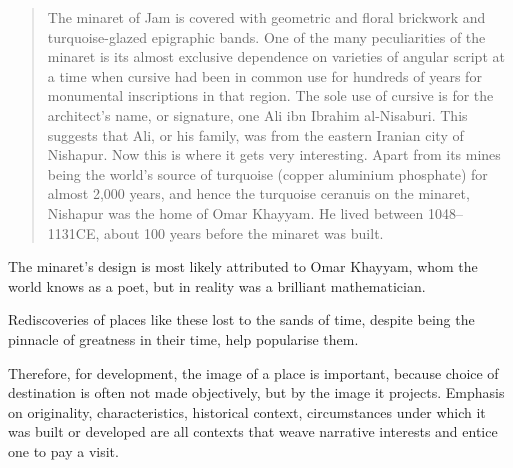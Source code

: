 \begin{quote}
  The minaret of Jam is covered with geometric and floral brickwork and turquoise-glazed epigraphic bands. One of the many peculiarities of the minaret is its almost exclusive dependence on varieties of angular script at a time when cursive had been in common use for hundreds of years for monumental inscriptions in that region. The sole use of cursive is for the architect's name, or signature, one Ali ibn Ibrahim al-Nisaburi. This suggests that Ali, or his family, was from the eastern Iranian city of Nishapur. Now this is where it gets very interesting. Apart from its mines being the world's source of turquoise (copper aluminium phosphate) for almost 2,000 years, and hence the turquoise ceranuis on the minaret, Nishapur was the home of Omar Khayyam. He lived between 1048--1131CE, about 100 years before the minaret was built.
\end{quote}

\noindent The minaret's design is most likely attributed to Omar Khayyam, whom the world knows as a poet, but in reality was a brilliant mathematician.

Rediscoveries of places like these lost to the sands of time, despite being the pinnacle of greatness in their time, help popularise them.  

Therefore, for development, the image of a place is important, because choice of destination is often not made objectively, but by the image it projects. Emphasis on originality, characteristics, historical context, circumstances under which it was built or developed are all contexts that weave narrative interests and entice one to pay a visit.

